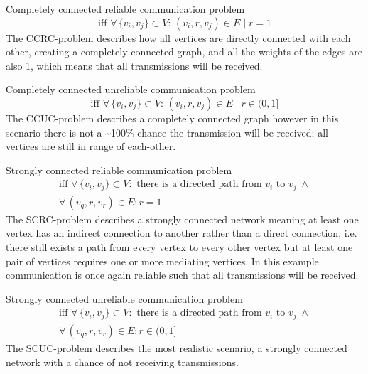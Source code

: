 \begin{description}[labelindent=\parindent,itemsep=2em]
    \item[CCRC-problem:] Completely connected reliable communication problem   
    \begin{equation}
    \text{iff } \forall\, \{v_i, v_j\} \subset V: \, (v_i,r,v_j)\in E \mid r = 1    
    \end{equation}
    The CCRC-problem describes how all vertices are directly connected with each other, creating a completely connected graph, and all the weights of the edges are also 1, which means that all transmissions will be received. 
    
    \item[CCUC-problem:] Completely connected unreliable communication problem
    \begin{equation}
    \text{iff } \forall\, \{v_i, v_j\} \subset V: \, (v_i,r,v_j)\in E \mid r \in (0, 1]
    \end{equation}
    The CCUC-problem describes a completely connected graph however in this scenario there is not a \textasciitilde100\% chance the transmission will be received; all vertices are still in range of each-other. 
    
    \item[SCRC-problem:] Strongly connected reliable communication problem
    \begin{equation}
    \begin{gathered}
    \text{iff } \forall\, \{v_i, v_j\} \subset V: \text{ there is a directed path from } v_i \text{ to } v_j\; \land \\ \forall\, (v_q, r, v_r) \in E : r = 1
    \end{gathered}  
    \end{equation}   
    The SCRC-problem describes a strongly connected network meaning at least one vertex has an indirect connection to another rather than a direct connection, i.e. there still exists a path from every vertex to every other vertex but at least one pair of vertices requires one or more mediating vertices. In this example communication is once again reliable such that all transmissions will be received. 
    
    \item[SCUC-problem:] Strongly connected unreliable communication problem
    \begin{equation}
    \begin{gathered}
    \text{iff } \forall\, \{v_i, v_j\} \subset V: \text{ there is a directed path from } v_i \text{ to } v_j\; \land \\ \forall\, (v_q, r, v_r) \in E : r \in (0, 1]
    \end{gathered}  
    \end{equation}    
    The SCUC-problem describes the most realistic scenario, a strongly connected network with a chance of not receiving transmissions. 
\end{description}
